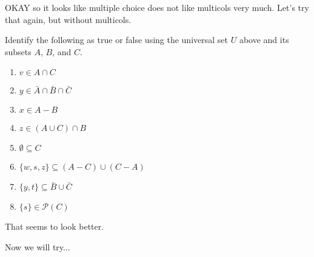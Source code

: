 \documentclass{ximera}
\begin{document}
OKAY so it looks like multiple choice does not like multicols very much. Let's try that again, but without multicols.

\begin{question}  
Identify the following as true or false using the universal set $U$ above and its subsets $A$, $B$, and $C$.
\begin{prompt}
\begin{enumerate}
        \item $v \in A \cap C$
            \begin{multipleChoice}
            \end{multipleChoice} 
			
		\item $y \in \bar{A} \cap \bar{B} \cap \bar{C}$
		    \begin{multipleChoice}
            \end{multipleChoice}	
		\item $x \in A - B$
		    \begin{multipleChoice}
            \end{multipleChoice}	
		\item $z \in (A \cup C) \cap B$
		    \begin{multipleChoice}
            \end{multipleChoice}	
		\item $\emptyset \subseteq C$
		    \begin{multipleChoice}
            \end{multipleChoice}	
		\item $\{w, s, z\} \subseteq (A - C) \cup (C - A)$
		    \begin{multipleChoice}
            \end{multipleChoice}	
		\item $\{y,t\} \subseteq \bar{B} \cup \bar{C}$
		    \begin{multipleChoice}
            \end{multipleChoice}	
		\item $\{s\} \in \mathcal{P}(C)$
	        \begin{multipleChoice}
            \end{multipleChoice}
\end{enumerate}
\end{prompt}
\end{question}

That seems to look better.

Now we will try...
\end{document}
